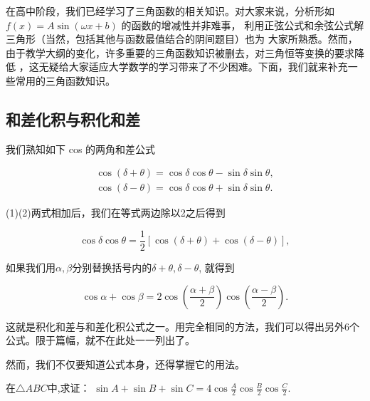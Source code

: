 在高中阶段，我们已经学习了三角函数的相关知识。对大家来说，分析形如$f(x)=A\sin(\omega x+b) $
的函数的增减性并非难事，%
利用正弦公式和余弦公式解三角形（当然，包括其他与函数最值结合的阴间题目）也为
大家所熟悉。然而，由于教学大纲的变化，许多重要的三角函数知识被删去，对三角恒等变换的要求降低
，这无疑给大家适应大学数学的学习带来了不少困难。下面，我们就来补充一些常用的三角函数知识。
\subsection{和差化积与积化和差}

我们熟知如下 cos 的两角和差公式

\begin{gather}
    \cos(\delta +\theta )=\cos \delta  \cos \theta -\sin \delta  \sin \theta,\\
    \cos (\delta -\theta )=\cos \delta  \cos \theta +\sin \delta  \sin \theta.
\end{gather}

(1)(2)两式相加后，我们在等式两边除以2之后得到

\begin{equation}
    \cos \delta  \cos \theta=\frac{1}{2}[\cos(\delta +\theta )+\cos (\delta -\theta )],
\end{equation}

如果我们用$\alpha,\beta$分别替换括号内的$\delta +\theta,\delta -\theta$, 就得到

\begin{equation}
    \cos \alpha + \cos \beta = 2\cos\left( \frac{\alpha+\beta}{2} \right) \cos\left( \frac{\alpha-\beta}{2} \right) .
\end{equation}

这就是积化和差与和差化积公式之一。用完全相同的方法，我们可以得出另外6个公式。限于篇幅，就不在此处一一列出了。

然而，我们不仅要知道公式本身，还得掌握它的用法。

\begin{example}
    在$\bigtriangleup ABC $中,求证：%
    $\sin A+\sin B+\sin C=4\cos \frac{A}{2}\cos \frac{B}{2}\cos \frac{C}{2}$.
\end{example}

